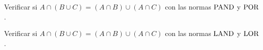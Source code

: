Verificar si \(A ∩ (B ∪ C) = (A ∩ B) ∪ (A ∩ C)\)
con las normas \(\operatorname{PAND}\) y \(\operatorname{POR}\).

Verificar si \(A ∩ (B ∪ C) = (A ∩ B) ∪ (A ∩ C)\)
con las normas \(\operatorname{LAND}\) y \(\operatorname{LOR}\).

